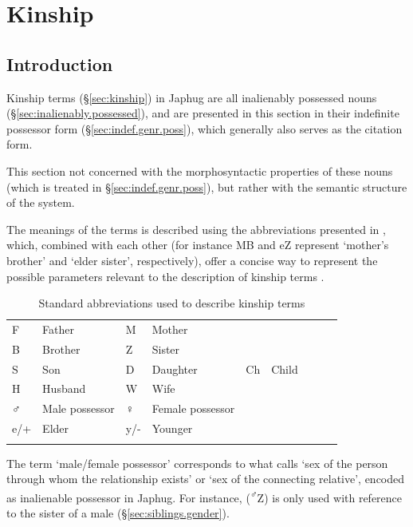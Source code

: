 \chapter{Kinship} \label{chap:kinship}

\section{Introduction}
Kinship terms (§\ref{sec:kinship}) in Japhug are all inalienably possessed nouns (§\ref{sec:inalienably.possessed}), and are presented in this section in their indefinite possessor form (§\ref{sec:indef.genr.poss}), which generally also serves as the citation form.

This section not concerned with the morphosyntactic properties of these nouns (which is treated in §\ref{sec:indef.genr.poss}), but rather with the semantic structure of the system. 

The meanings of the terms is described using the abbreviations presented in , which, combined with each other (for instance MB and  eZ represent `mother's brother' and  `elder sister', respectively), offer a concise way to represent the possible parameters relevant to the description of kinship terms \citep{kroeber1909classificatory}. 

 
\begin{table}
\caption{Standard abbreviations used to describe kinship terms} \label{tab:kinship.abb}
\begin{tabular}{llXllXlll}
\lsptoprule
F & Father & M & Mother \\
B & Brother & Z & Sister \\
S & Son & D & Daughter & Ch & Child \\
H & Husband & W & Wife \\
♂  & Male possessor & ♀& Female possessor \\
e/+ & Elder & y/- & Younger \\
\lspbottomrule
\end{tabular}
\end{table}

The term `male/female possessor' corresponds to what \citet[78--79]{kroeber1909classificatory} calls `sex of the person through whom the relationship exists' or `sex of the connecting relative', encoded as inalienable possessor in Japhug. For instance,  (\textsuperscript{♂}Z) is only used with reference to the sister of a male (§\ref{sec:siblings.gender}).

